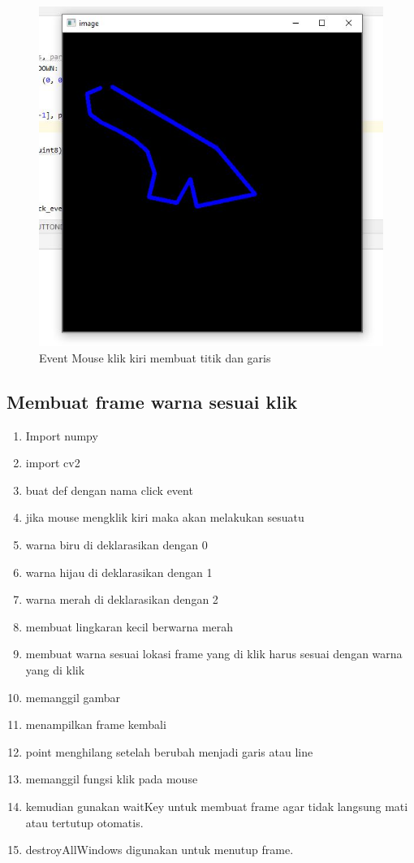\newpage
\begin{figure}[ht]
\centering
\includegraphics[scale=0.5]{figures/2,23,2.jpg}
\caption{Event Mouse klik kiri membuat titik dan garis}
\label{contoh}
\end{figure}



\newpage
\subsection{Membuat frame warna sesuai klik}

\begin{enumerate}
	\item Import numpy
	\item import cv2
	\item buat def dengan nama click event
	\item jika mouse mengklik kiri maka akan melakukan sesuatu
	\item warna biru di deklarasikan dengan 0
	\item warna hijau di deklarasikan dengan 1
	\item warna merah di deklarasikan dengan 2
	\item membuat lingkaran kecil berwarna merah
	\item membuat warna sesuai lokasi frame yang di klik harus sesuai dengan warna yang di klik
	\item memanggil gambar
	\item menampilkan frame kembali
	\item point menghilang setelah berubah menjadi garis atau line
	\item memanggil fungsi klik pada mouse
	\item kemudian gunakan waitKey untuk membuat frame agar tidak langsung mati atau tertutup otomatis.
	\item destroyAllWindows digunakan untuk menutup frame.

\end{enumerate}

